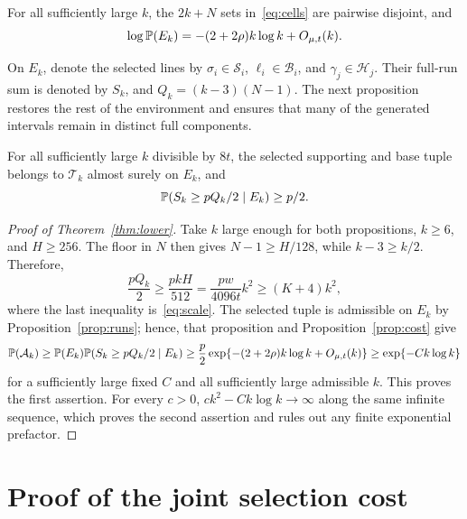 \documentclass[11pt,letterpaper]{article}
\begin{document}
\begin{proposition}\label{prop:cost}
For all sufficiently large $k$, the $2k+N$ sets in~\eqref{eq:cells} are pairwise disjoint, and
\begin{equation}\label{eq:cost}
 \log\P(E_k)=-(2+2\rho)k\log k+O_{\mu,t}(k).
\end{equation}
\end{proposition}

On $E_k$, denote the selected lines by $\sigma_i\in\mathscr S_i$, $\ell_i\in\mathscr B_i$, and $\gamma_j\in\mathscr H_j$. Their full-run sum is denoted by $S_k$, and $Q_k=(k-3)(N-1)$. The next proposition restores the rest of the environment and ensures that many of the generated intervals remain in distinct full components.

\begin{proposition}\label{prop:runs}
For all sufficiently large $k$ divisible by $8t$, the selected supporting and base tuple belongs to $\mathcal T_k$ almost surely on $E_k$, and
\begin{equation}\label{eq:conditional}
 \P(S_k\ge pQ_k/2\mid E_k)\ge p/2.
\end{equation}
\end{proposition}

\begin{proof}[Proof of Theorem~\ref{thm:lower}]
Take $k$ large enough for both propositions, $k\ge6$, and $H\ge256$. The floor in $N$ then gives $N-1\ge H/128$, while $k-3\ge k/2$. Therefore,
\begin{equation}\label{eq:threshold}
 \frac{pQ_k}{2}
 \ge\frac{pkH}{512}
 =\frac{pw}{4096t}k^2
 \ge(K+4)k^2,
\end{equation}
where the last inequality is~\eqref{eq:scale}. The selected tuple is admissible on $E_k$ by Proposition~\ref{prop:runs}; hence, that proposition and Proposition~\ref{prop:cost} give
\begin{equation}\label{eq:synthesis}
 \P(\mathcal A_k)
 \ge\P(E_k)\P(S_k\ge pQ_k/2\mid E_k)
 \ge\frac p2\exp\{-(2+2\rho)k\log k+O_{\mu,t}(k)\}
 \ge\exp\{-Ck\log k\}
\end{equation}
for a sufficiently large fixed $C$ and all sufficiently large admissible $k$. This proves the first assertion. For every $c>0$, $ck^2-Ck\log k\to\infty$ along the same infinite sequence, which proves the second assertion and rules out any finite exponential prefactor.
\end{proof}

\section{Proof of the joint selection cost}
\end{document}
